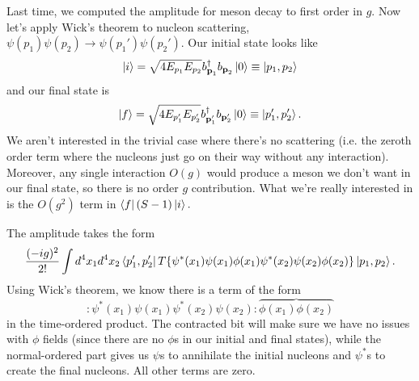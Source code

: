 Last time, we computed the amplitude for meson decay to first order in $g$. Now let's apply Wick's theorem to nucleon scattering, $\psi(p_1)\psi(p_2)\to \psi(p_1')\psi(p_2').$
Our initial state looks like
$$\left| i \right>=\sqrt{4 E_{p_1} E_{p_2}}b_{\boldsymbol{\mathbf{p}}_1}^\dagger b_{\boldsymbol{\mathbf{p}}_2} \left| 0 \right> \equiv \left| p_1,p_2 \right>$$
and our final state is
$$\left| f \right>=\sqrt{4 E_{p_1'} E_{p_2'}}b_{\boldsymbol{\mathbf{p}}_1'}^\dagger b_{\boldsymbol{\mathbf{p}}_2'} \left| 0 \right> \equiv \left| p_1',p_2' \right>.$$
We aren't interested in the trivial case where there's no scattering (i.e. the zeroth order term where the nucleons just go on their way without any interaction). Moreover, any single interaction $O(g)$ would produce a meson we don't want in our final state, so there is no order $g$ contribution. What we're really interested in is the $O(g^2)$ term in $\left< f \right|(S-1)\left| i \right>.$

The amplitude takes the form
$$\frac{(-ig)^2}{2!}\int d^4x_1 d^4x_2 \left< p_1',p_2' \right|T\{\psi^*(x_1)\psi(x_1) \phi(x_1) \psi^*(x_2) \psi(x_2)\phi(x_2)\}\left| p_1,p_2 \right>.$$
Using Wick's theorem, we know there is a term of the form
$$:\psi^*(x_1)\psi(x_1)\psi^*(x_2)\psi(x_2): \overbrace{\phi(x_1)\phi(x_2)}$$
in the time-ordered product. The contracted bit will make sure we have no issues with $\phi$ fields (since there are no $\phi$s in our initial and final states), while the normal-ordered part gives us $\psi$s to annihilate the initial nucleons and $\psi^*$s to create the final nucleons. All other terms are zero.

